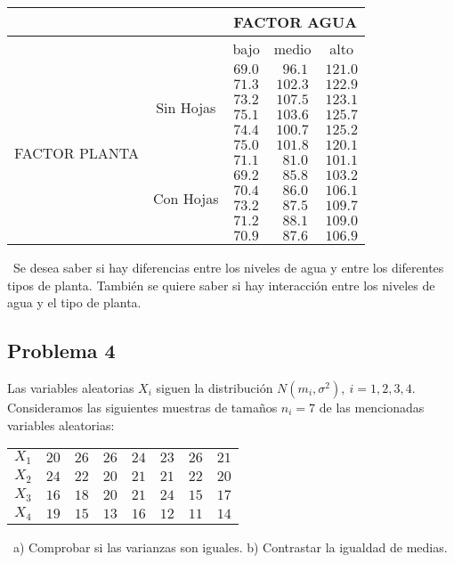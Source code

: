 \documentclass[
]{article}
\begin{document}
\begin{center}
\begin{tabular}{c|c|c|c|c|}
&&\multicolumn{3}{c|}{FACTOR AGUA}\\\hline
& &{bajo}&{medio}&{alto}\\\cline{3-5}
\multirow{12}{1.75cm}{FACTOR PLANTA}&\multirow{6}{1cm}{Sin Hojas}&
$69.0$&$\ \,96.1$&$121.0$\\\cline{3-5}
&&$71.3$&$102.3$&$122.9$\\\cline{3-5}
&&$73.2$&$107.5$&$123.1$\\\cline{3-5}
&&$75.1$&$103.6$&$125.7$\\\cline{3-5}
&&$74.4$&$100.7$&$125.2$\\\cline{3-5}
&&$75.0$&$101.8$&$120.1$\\\cline{2-5}
&\multirow{6}{1cm}{Con Hojas}&$71.1$&$\ \,81.0$&$101.1$\\\cline{3-5}
&&$69.2$&$\ \,85.8$&$103.2$\\\cline{3-5}
&&$70.4$&$\ \,86.0$&$106.1$\\\cline{3-5}
&&$73.2$&$\ \,87.5$&$109.7$\\\cline{3-5}
&&$71.2$&$\ \,88.1$&$109.0$\\\cline{3-5}
&&$70.9$&$\ \,87.6$&$106.9$\\\hline
\end{tabular}
\end{center}

~\newline Se desea saber si hay diferencias entre los niveles de agua y
entre los diferentes tipos de planta. También se quiere saber si hay
interacción entre los niveles de agua y el tipo de planta.

\hypertarget{problema-4}{%
\subsection{Problema 4}\label{problema-4}}

Las variables aleatorias \(X_i\) siguen la distribución
\(N(m_i,\sigma^2),\ i=1,2,3,4\). Consideramos las siguientes muestras de
tamaños \(n_i=7\) de las mencionadas variables aleatorias: ~\newline

\begin{center}
\begin{tabular}{cccccccc}
$X_1$&$20$&$26$&$26$&$24$&$23$&$26$&$21$\\
$X_2$&$24$&$22$&$20$&$21$&$21$&$22$&$20$\\
$X_3$&$16$&$18$&$20$&$21$&$24$&$15$&$17$\\
$X_4$&$19$&$15$&$13$&$16$&$12$&$11$&$14$\\
\end{tabular}
\end{center}

~\newline a) Comprobar si las varianzas son iguales. b) Contrastar la
igualdad de medias.
\end{document}

